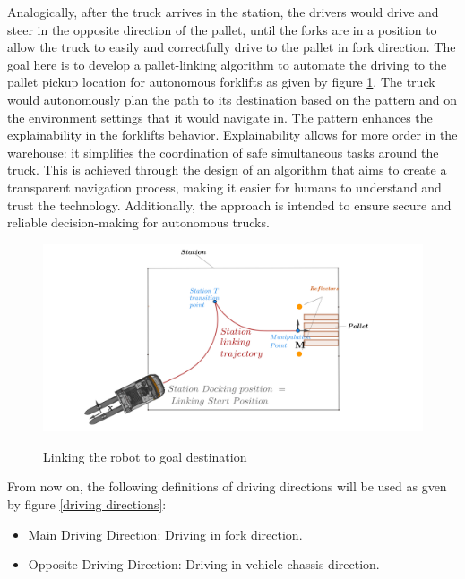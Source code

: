 Analogically, after the truck arrives in the station, the drivers would drive and steer in the opposite direction of the 
pallet, until the forks are in a position to allow the truck to easily and correctfully drive to the pallet in fork direction.
The goal here is to develop a pallet-linking algorithm to automate the driving to the pallet pickup location for 
autonomous forklifts as given by figure \ref{pattern}. The truck would autonomously plan the path to its destination
based on the pattern and on the environment settings that it would navigate in. 
The pattern enhances the explainability in the forklifts behavior. Explainability allows for more order in the warehouse: 
it simplifies the coordination of safe simultaneous tasks around the truck. This is achieved through the design of an 
algorithm that aims to create a transparent navigation process, making it easier for humans to understand and trust 
the technology. Additionally, the approach is intended to ensure secure and reliable decision-making for autonomous trucks.



\begin{figure}
    [H]
    \begin{center}
    \includegraphics[width=\linewidth]{images/Chap2/station-without-subpolygones.png}\\
    \caption{Linking the robot to goal destination \cite{R28}}
    \label{pattern}
    \end{center}
\end{figure}
From now on, the following definitions of driving directions will be used as gven by figure \ref{driving directions}:
\begin{itemize}
    \item Main Driving Direction: Driving in fork direction.
    \item Opposite Driving Direction: Driving in vehicle chassis direction.
\end{itemize}

